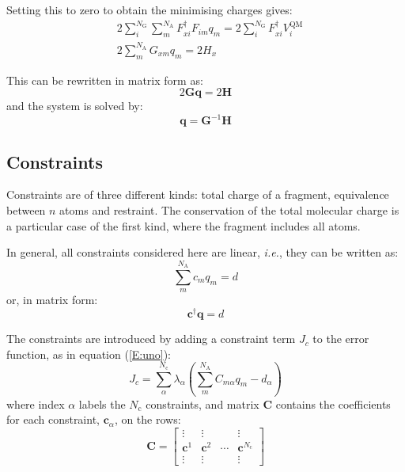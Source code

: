 \documentclass[a4paper]{report}
\newcommand{\bs}{\boldsymbol}
\newcommand{\NAA}[0]{{N_\mathrm{A}}}
\newcommand{\NGG}[0]{{N_\mathrm{G}}}
\newcommand{\NCC}[0]{{N_\mathrm{c}}}
\begin{document}
Setting this to zero to obtain the minimising charges gives:
\begin{align}
\label{E:B}
&2\sum_i^\NGG \sum_m^\NAA F_{xi}^\dagger F_{im} q_m = 2\sum_i^\NGG F^\dag_{xi} V^\mathrm{QM}_i \\
\label{E:C}
&2\sum_m^\NAA G_{xm} q_m = 2H_x
\end{align}

This can be rewritten in matrix form as:
\begin{equation}
\label{E:matrix1}
2\bs{G} \bs{q} = 2\bs{H}
\end{equation}
and the system is solved by:
\begin{equation}
\bs{q} = \bs{G}^{-1} \bs{H}
\end{equation}

\subsection*{Constraints}

Constraints are of three different kinds: total charge of a fragment, equivalence between $n$ atoms and restraint. The conservation of the total molecular charge is a particular case of the first kind, where the fragment includes all atoms.

In general, all constraints considered here are linear, \emph{i.e.}, they can be written as:
\begin{equation}
\sum_m^\NAA c_m q_m = d
\end{equation}
or, in matrix form:
\begin{equation}
\bs{c}^\dag \bs{q} = d
\end{equation}

The constraints are introduced by adding a constraint term $J_c$ to the error function, as in equation (\ref{E:uno}):
\begin{equation}
J_c = \sum_\alpha^\NCC \lambda_\alpha \left( \sum_m^\NAA C_{m\alpha} q_m -d_\alpha\right)
\end{equation}
where index $\alpha$ labels the $\NCC$ constraints, and matrix $\bs{C}$ contains the coefficients for each constraint, $\bs{c}_\alpha$, on the rows:
\begin{equation}
\bs{C} = \left[ 
\begin{array}{cccc} 
\vdots & \vdots & &\vdots \\ 
\bs{c}^1 & \bs{c}^2 & \cdots & \bs{c}^\NCC \\
\vdots & \vdots & &\vdots 
\end{array}\right]
\end{equation}
\end{document}
